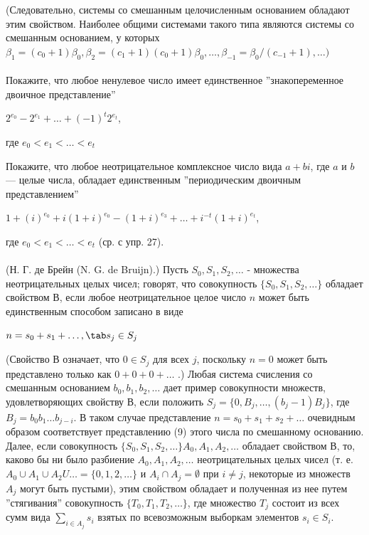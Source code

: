 


\newpage
{}

\noindent(Следовательно, системы со смешанным целочисленным основанием обладают этим свойством. Наиболее общими системами такого типа являются системы со смешанным основанием, у которых $\beta_{1} = (c_{0} + 1)\beta_{0}, \beta_{2} = (c_{1} + 1)(c_{0} + 1)\beta_{0},  \ldots , \beta_{-1} = \beta_{0}/(c_{-1} + 1),  \ldots )$

\paragraph{} 
Покажите, что любое ненулевое число имеет единственное ''знакопеременное двоичное представление''
\begin{center}
$2^{e_{0}} - 2 ^{e_{1}} +  \ldots  + (-1)^{t}2^{e_{t}}$,
\end{center}
где $e_{0} < e_{1} <  \ldots  < e_{t}$

\paragraphT{} 
Покажите, что любое неотрицательное комплексное число вида $a + bi$, где $a$ и $b$ — целые числа, обладает единственным ''периодическим двоичным представлением''
\begin{center}
$1+(i)^{e_{0}} + i(1 + i)^{e_{0}} - (1 + i)^{e_{3}} +  \ldots  + i^{-t}(1+i)^{e_{t}}$,
\end{center}
где $e_{0} < e_{1} <  \ldots  < e_{t}$ (ср. с упр. 27).

\paragraph{} 
(Н. Г. де Брейн (N. G. de Bruijn).) Пусть $S_{0}, S_{1}, S_{2},  \ldots $ - множества неотрицательных целых чисел; говорят, что совокупность $\lbrace S_{0}, S_{1}, S_{2},  \ldots \rbrace$ обладает свойством В, если любое неотрицательное целое число $n$ может быть единственным способом записано в виде
\begin{center}
$n = s_{0} + s_{1} +  \ldots , \tab s_{j} \in S_{j}$
\end{center}
(Свойство В означает, что $0 \in S_{j}$ для всех $j$, поскольку $n = 0$ может быть представлено только как $0 + 0 + 0 +  \ldots $ .) Любая система счисления со смешанным основанием $b_{0}, b_{1}, b_{2}, \ldots $ дает пример совокупности множеств, удовлетворяющих свойству В, если положить $S_{j} = \lbrace 0, B_{j}, \ldots , (b_{j} - 1)B_{j} \rbrace$, где $B_{j} = b_{0}b_{1}  \ldots b_{j-i}.$ В таком случае представление $n = s_{0} + s_{1} + s_{2} +  \ldots  $ очевидным образом соответствует представлению (9) этого числа по смешанному основанию. Далее, если совокупность $\lbrace S_{0}, S_{1}, S_{2}, \ldots \rbrace A_{0}, A_{1}, A_{2},  \ldots $ обладает
свойством В, то, каково бы ни было разбиение $A_{0}, A_{1}, A_{2},  \ldots $ неотрицательных целых чисел (т. е. $A_{0} \cup A_{1} \cup A_{2} U  \ldots  = \lbrace 0,1, 2, \ldots \rbrace$ и $A_{i} \cap A_{j} = \emptyset $ при $ i \neq j $, некоторые из множеств $A_{j}$ могут быть пустыми), этим свойством обладает и полученная из нее путем ''стягивания'' совокупность $\lbrace T_{0}, T_{1}, T_{2}, \ldots  \rbrace$, где множество $T_{j}$ состоит из всех сумм вида $\sum_{i \in A_{j}}s_{i}$ взятых по всевозможным выборкам элементов $s_{i} \in S_{i}$.

